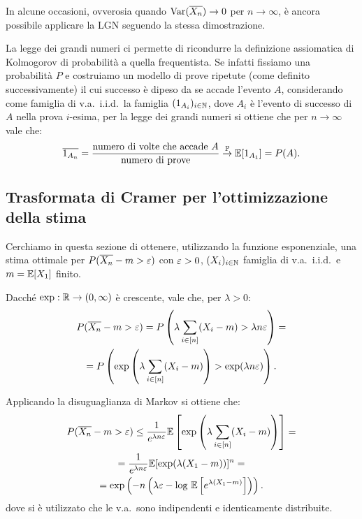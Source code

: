 \begin{multicols*}{2}
\begin{remark}
    In alcune occasioni, ovverosia quando $\operatorname{Var}(\overline{X_n}) \to 0$
    per $n \to \infty$, è ancora possibile applicare la LGN seguendo la stessa
    dimostrazione.
\end{remark}

\begin{remark}
    La legge dei grandi numeri ci permette di ricondurre la definizione
    assiomatica di Kolmogorov di probabilità a quella frequentista. Se
    infatti fissiamo una probabilità $P$ e costruiamo un modello di prove
    ripetute (come definito successivamente) il cui successo è dipeso
    da se accade l'evento $A$, considerando come famiglia di
    v.a.~i.i.d.~la famiglia $(1_{A_i})_{i \in \mathbb{N}}$, dove $A_i$ è l'evento di successo di $A$ nella prova
    $i$-esima, per la legge dei grandi numeri si ottiene che per $n \to \infty$ vale che:
    \[
        \overline{1_{A_n}} = \frac{\text{numero di volte che accade $A$}}{\text{numero di prove}} \overset{\mathbb{P}}{\to} \mathbb{E}[1_{A_1}] = P(A).
    \]
\end{remark}

\subsection{Trasformata di Cramer per l'ottimizzazione della stima}

Cerchiamo in questa sezione di ottenere, utilizzando la funzione
esponenziale, una stima ottimale per
$P(\overline{X_n} - m > \varepsilon)$ con $\varepsilon > 0$, $(X_i)_{i \in \mathbb{N}}$ famiglia
di v.a.~i.i.d.~e $m = \mathbb{E}[X_1]$ finito. \smallskip

Dacché $\exp : \mathbb{R} \to (0, \infty)$ è crescente, vale che, per $\lambda > 0$:
\begin{multline*}
    P(\overline{X_n} - m > \varepsilon) = P\left(\lambda \sum_{i \in [n]} (X_i - m) > \lambda n \varepsilon\right) = \\ = P\left(\exp\left(\lambda \sum_{i \in [n]} (X_i - m)\right) > \exp(\lambda n \varepsilon)\right).
\end{multline*}

Applicando la disuguaglianza di Markov si ottiene che:
\begin{multline*}
    P(\overline{X_n} - m > \varepsilon) \leq \frac{1}{e^{\lambda n \varepsilon}} \mathbb{E}\left[\exp\left(\lambda \sum_{i \in [n]} (X_i - m)\right)\right] = \\
    = \frac{1}{e^{\lambda n \varepsilon}} \mathbb{E}[\exp(\lambda(X_1 - m))]^n = \\
    = \exp\left(-n\left(\lambda \varepsilon - \log \, \mathbb{E}\left[e^{\lambda(X_1-m)}\right]\right)\right).
\end{multline*}
dove si è utilizzato che le v.a.~sono indipendenti e identicamente distribuite.


\end{multicols*}

